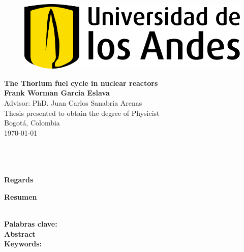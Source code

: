 
\begin{center}
\begin{figure}
    \centering%
    \includegraphics[scale=0.35]{HojaTitulo/Figures_HojaTitulo/Universidad_de_los_Andes_(logo).png} %
\end{figure}
\thispagestyle{empty} \vspace*{2.0cm} \textbf{\LARGE
The Thorium fuel cycle in nuclear reactors}\\[2.5cm]

\Large\textbf{Frank Worman Garcia Eslava}\\[2.0cm]

Advisor: PhD. Juan Carlos Sanabria Arenas \\[2.0cm]


\Large Thesis presented to obtain the degree of Physicist \\ [2.0cm]


Bogot\'{a}, Colombia\\ [0.5cm]
\today \\
\end{center}

\newpage{\pagestyle{empty}\cleardoublepage}

\newpage
\thispagestyle{empty} \textbf{}\normalsize
\\\\\\%
\textbf{\LARGE Regards}\\



\newpage

\textbf{\LARGE Resumen}
\\


\textbf{\small Palabras clave: }\\


\newpage
\textbf{\LARGE Abstract}\\


\textbf{\small Keywords:}\\